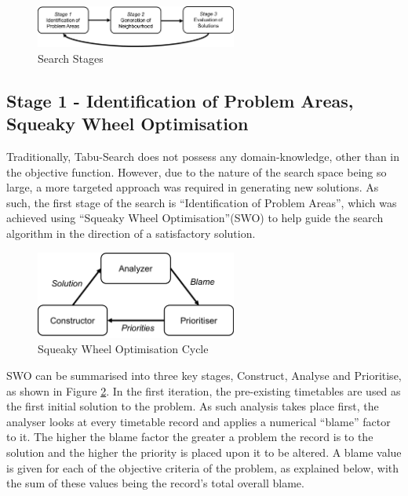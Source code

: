 \documentclass{article}
\begin{document}
\begin{figure}[H]
	\centering
	\includegraphics[width=250px]{images/searchCycle2.png}
	\caption{Search Stages}
	\label{fig:tabuSearch}
\end{figure}




\subsection{Stage 1 - Identification of Problem Areas,  Squeaky Wheel Optimisation}

Traditionally, Tabu-Search does not possess any domain-knowledge, other than in the objective function. However, due to the nature of the search space being so large, a more targeted approach was required in generating new solutions. As such, the first stage of the search is ``Identification of Problem Areas'', which was achieved using ``Squeaky Wheel Optimisation''(SWO) to help guide the search algorithm in the direction of a satisfactory solution. 

\par

\begin{figure}[H]
	\centering
	\includegraphics[width=250px]{images/swo.png}
	\caption{Squeaky Wheel Optimisation Cycle \cite{RN39}}
	\label{fig:swo}
\end{figure}

SWO can be summarised into three key stages, Construct, Analyse and Prioritise, as shown in Figure \ref{fig:swo}. In the first iteration, the pre-existing timetables are used as the first initial solution to the problem. As such analysis takes place first, the analyser looks at every timetable record and applies a numerical ``blame'' factor to it. The higher the blame factor the greater a problem the record is to the solution and the higher the priority is placed upon it to be altered. A blame value is given for each of the objective criteria of the problem, as explained below, with the sum of these values being the record's total overall blame.
\end{document}
